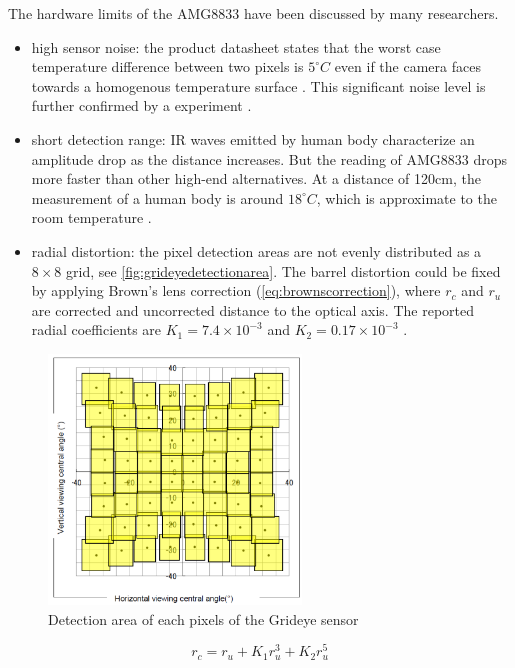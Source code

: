 The hardware limits of the AMG8833 have been discussed by many researchers.
\begin{itemize}
  \item high sensor noise: the product datasheet states that the worst case temperature difference between two pixels is $5^\circ C$ even if the camera faces towards a homogenous temperature surface \cite{grideye_datasheet}. This significant noise level is further confirmed by a experiment \cite{firstflow}.
  \item short detection range: IR waves emitted by human body characterize an amplitude drop as the distance increases. But the reading of AMG8833 drops more faster than other high-end alternatives. At a distance of 120cm, the measurement of a human body is around $18^\circ C$, which is approximate to the room temperature \cite{firstflow}.
  \item radial distortion: the pixel detection areas are not evenly distributed as a $8\times8$ grid, see \autoref{fig:grideyedetectionarea}. The barrel distortion could be fixed by applying Brown's lens correction (\autoref{eq:brownscorrection}), where $r_c$ and $r_u$ are corrected and uncorrected distance to the optical axis. The reported radial coefficients are $K_1=7.4\times 10^{-3}$ and $K_2=0.17\times10^{-3}$ \cite{gonzalez2013using}.
\end{itemize}
\begin{figure}
  \centering
  \includegraphics[width=0.6\textwidth]{figures/grideye_detectionarea.PNG}
  \caption{Detection area of each pixels of the Grideye sensor}\label{fig:grideyedetectionarea}
\end{figure}
\begin{equation}\label{eq:brownscorrection}
  r_c = r_u + K_1r_u^3+K_2r_u^5
\end{equation}
